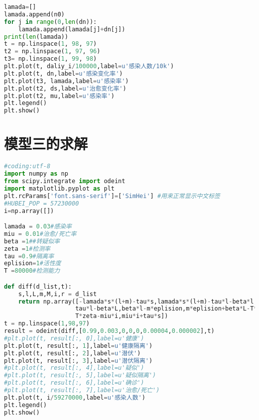 \documentclass[withoutpreface,bwprint]{cumcmthesis} %
\begin{document}
\begin{appendices}
\begin{lstlisting}[language=python]
lamada=[]
lamada.append(n0)
for j in range(0,len(dn)):
    lamada.append(lamada[j]+dn[j])
print(len(lamada))
t = np.linspace(1, 98, 97)
t2 = np.linspace(1, 97, 96)
t3= np.linspace(1, 99, 98)
plt.plot(t, daliy_i/100000,label=u'感染人数/10k')
plt.plot(t, dn,label=u'感染变化率')
plt.plot(t3, lamada,label=u'感染率')
plt.plot(t2, ds,label=u'治愈变化率')
plt.plot(t2, mu,label=u'感染率')
plt.legend()
plt.show()


 \end{lstlisting}
 \section{模型三的求解}
\begin{lstlisting}[language=python]
#coding:utf-8
import numpy as np
from scipy.integrate import odeint
import matplotlib.pyplot as plt
plt.rcParams['font.sans-serif']=['SimHei'] #用来正常显示中文标签
#HUBEI_POP = 57230000
i=np.array([])

lamada = 0.03#感染率
miu = 0.01#治愈/死亡率
beta =1##转疑似率
zeta =1#检测率
tau =0.9#隔离率
eplision=1#活性度
T =80000#检测能力

def diff(d_list,t):
    s,l,L,m,M,i,r = d_list
    return np.array([-lamada*s*(l+m)-tau*s,lamada*s*(l+m)-tau*l-beta*l,
                    tau*l-beta*L,beta*l-m*eplision,m*eplision+beta*L-T*zeta,
                    T*zeta-miu*i,miu*i+tau*s])
t = np.linspace(1,98,97)
result = odeint(diff,[0.99,0.003,0,0,0,0.00004,0.000002],t)
#plt.plot(t, result[:, 0],label=u'健康')
plt.plot(t, result[:, 1],label=u'健康隔离')
plt.plot(t, result[:, 2],label=u'潜伏')
plt.plot(t, result[:, 3],label=u'潜伏隔离')
#plt.plot(t, result[:, 4],label=u'疑似')
#plt.plot(t, result[:, 5],label=u'疑似隔离')
#plt.plot(t, result[:, 6],label=u'确诊')
#plt.plot(t, result[:, 7],label=u'治愈/死亡')
plt.plot(t, i/59270000,label=u'感染人数')
plt.legend()
plt.show()
 \end{lstlisting}
\end{appendices}
\end{document}
